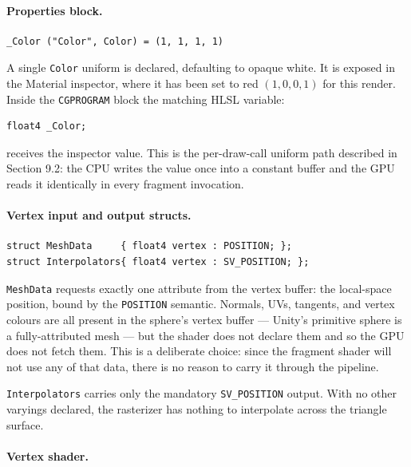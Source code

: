 \documentclass[11pt]{article}
\begin{document}
\paragraph{Properties block.}

\begin{lstlisting}
_Color ("Color", Color) = (1, 1, 1, 1)
\end{lstlisting}

A single \texttt{Color} uniform is declared, defaulting to opaque white. It is exposed in the Material inspector, where it has been set to red $(1, 0, 0, 1)$ for this render. Inside the \texttt{CGPROGRAM} block the matching HLSL variable:

\begin{lstlisting}
float4 _Color;
\end{lstlisting}

receives the inspector value. This is the per-draw-call uniform path described in Section 9.2: the CPU writes the value once into a constant buffer and the GPU reads it identically in every fragment invocation.

\paragraph{Vertex input and output structs.}

\begin{lstlisting}
struct MeshData     { float4 vertex : POSITION; };
struct Interpolators{ float4 vertex : SV_POSITION; };
\end{lstlisting}

\texttt{MeshData} requests exactly one attribute from the vertex buffer: the local-space position, bound by the \texttt{POSITION} semantic. Normals, UVs, tangents, and vertex colours are all present in the sphere's vertex buffer --- Unity's primitive sphere is a fully-attributed mesh --- but the shader does not declare them and so the GPU does not fetch them. This is a deliberate choice: since the fragment shader will not use any of that data, there is no reason to carry it through the pipeline.

\texttt{Interpolators} carries only the mandatory \texttt{SV\_POSITION} output. With no other varyings declared, the rasterizer has nothing to interpolate across the triangle surface.

\paragraph{Vertex shader.}
\end{document}
